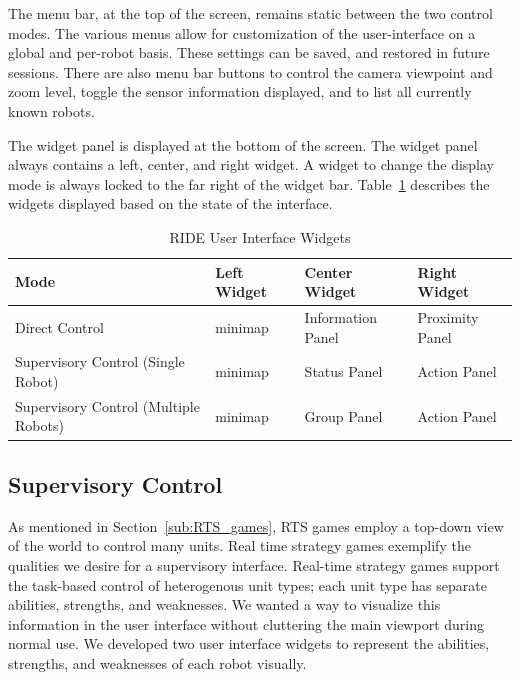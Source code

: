 The menu bar, at the top of the screen, remains static between the two control modes. The various menus allow for customization of the user-interface on a global and per-robot basis. These settings can be saved, and restored in future sessions. There are also menu bar buttons to control the camera viewpoint and zoom level, toggle the sensor information displayed, and to list all currently known robots.

The widget panel is displayed at the bottom of the screen. The widget panel always contains a left, center, and right widget. A widget to change the display mode is always locked to the far right of the widget bar. Table~\ref{tab:ui-widgets} describes the widgets displayed based on the state of the interface.

\begin{table}[ht]
\label{tab:ui-widgets}
\begin{center}
    \begin{tabular}{ | p{4cm} | l | l | l |}
    \hline
    \textbf{Mode} & \textbf{Left Widget} & \textbf{Center Widget} & \textbf{Right Widget} \\ \hline
    Direct Control & minimap & Information Panel & Proximity Panel \\ \hline
    Supervisory Control (Single Robot) & minimap & Status Panel & Action Panel \\ \hline
    Supervisory Control (Multiple Robots) & minimap & Group Panel & Action Panel \\ \hline
    \hline
    \end{tabular}
    \caption{RIDE User Interface Widgets}
\end{center}
\end{table}

\subsection{Supervisory Control}
\label{subs:ui-supervisor}

As mentioned in Section~\ref{sub:RTS_games}, RTS games employ a top-down view of the world to control many units. Real time strategy games exemplify the qualities we desire for a supervisory interface. Real-time strategy games support the task-based control of heterogenous unit types; each unit type has separate abilities, strengths, and weaknesses. We wanted a way to visualize this information in the user interface without cluttering the main viewport during normal use. We developed two user interface widgets to represent the abilities, strengths, and weaknesses of each robot visually.

